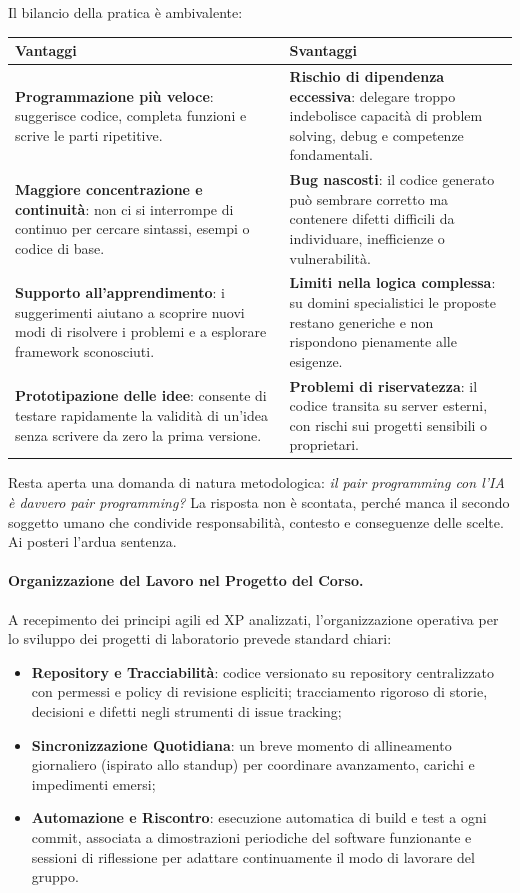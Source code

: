 \documentclass[12pt]{extarticle}
\begin{document}
\noindent Il bilancio della pratica è ambivalente:
\begin{center}
\small
\begin{tabular}{p{7cm}p{7cm}}
    \toprule
    \textbf{Vantaggi} & \textbf{Svantaggi} \\
    \midrule
    \textbf{Programmazione più veloce}: suggerisce codice, completa funzioni e scrive le parti ripetitive. & \textbf{Rischio di dipendenza eccessiva}: delegare troppo indebolisce capacità di problem solving, debug e competenze fondamentali. \\
    \addlinespace
    \textbf{Maggiore concentrazione e continuità}: non ci si interrompe di continuo per cercare sintassi, esempi o codice di base. & \textbf{Bug nascosti}: il codice generato può sembrare corretto ma contenere difetti difficili da individuare, inefficienze o vulnerabilità. \\
    \addlinespace
    \textbf{Supporto all'apprendimento}: i suggerimenti aiutano a scoprire nuovi modi di risolvere i problemi e a esplorare framework sconosciuti. & \textbf{Limiti nella logica complessa}: su domini specialistici le proposte restano generiche e non rispondono pienamente alle esigenze. \\
    \addlinespace
    \textbf{Prototipazione delle idee}: consente di testare rapidamente la validità di un'idea senza scrivere da zero la prima versione. & \textbf{Problemi di riservatezza}: il codice transita su server esterni, con rischi sui progetti sensibili o proprietari. \\
    \bottomrule
\end{tabular}
\end{center}

\noindent Resta aperta una domanda di natura metodologica: \textit{il pair programming con l'IA è davvero pair programming?} La risposta non è scontata, perché manca il secondo soggetto umano che condivide responsabilità, contesto e conseguenze delle scelte. Ai posteri l'ardua sentenza.

\paragraph{Organizzazione del Lavoro nel Progetto del Corso.}
A recepimento dei principi agili ed XP analizzati, l'organizzazione operativa per lo sviluppo dei progetti di laboratorio prevede standard chiari:
\begin{itemize}
    \item \textbf{Repository e Tracciabilità}: codice versionato su repository centralizzato con permessi e policy di revisione espliciti; tracciamento rigoroso di storie, decisioni e difetti negli strumenti di issue tracking;
    \item \textbf{Sincronizzazione Quotidiana}: un breve momento di allineamento giornaliero (ispirato allo standup) per coordinare avanzamento, carichi e impedimenti emersi;
    \item \textbf{Automazione e Riscontro}: esecuzione automatica di build e test a ogni commit, associata a dimostrazioni periodiche del software funzionante e sessioni di riflessione per adattare continuamente il modo di lavorare del gruppo.
\end{itemize}
\end{document}
